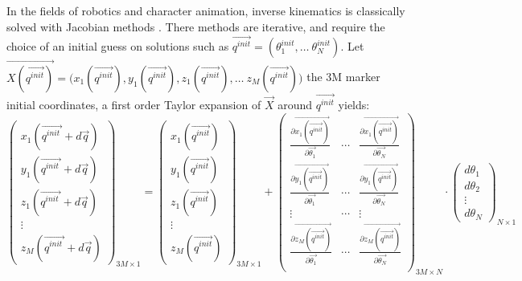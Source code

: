In the fields of robotics and character animation, inverse kinematics is classically solved with Jacobian methods \cite{Siciliano1990,Buss2009,Aristidou2018}. There methods are iterative, and require the choice of an initial guess on solutions such as $\overrightarrow{q^{init}}=(\theta_1^{init}, \dots \  \theta_N^{init})$. Let  $\overrightarrow{X(\overrightarrow{q^{init}})} = \bigl(x_1(\overrightarrow{q^{init}}), y_1(\overrightarrow{q^{init}}), z_1(\overrightarrow{q^{init}}), \dots \ z_M(\overrightarrow{q^{init}})\bigr)$ the 3M marker initial coordinates, a first order Taylor expansion of $\overrightarrow{X}$ around $\overrightarrow{q^{init}}$ yields:
\begin{equation}
    \begin{pmatrix}x_1(\overrightarrow{q^{init ^{\ }}}+d\overrightarrow{q})\\ y_1(\overrightarrow{q^{init ^{\ }}}+d\overrightarrow{q})\\ z_1(\overrightarrow{q^{init ^{\ }}}+d\overrightarrow{q})\\ \vdots \\ z_M(\overrightarrow{q^{init ^{\ }}}+d\overrightarrow{q})\end{pmatrix}_{3M \times 1}
    = \begin{pmatrix}x_1(\overrightarrow{q^{init}})\\ y_1(\overrightarrow{q^{init}})\\ z_1(\overrightarrow{q^{init}})\\ \vdots \\ z_M(\overrightarrow{q^{init}})\end{pmatrix}_{3M \times 1}
    + \begin{pmatrix}
        \frac{\partial{\overrightarrow{x_1(\overrightarrow{q^{init}})}}}{\partial{\overrightarrow{\theta_1}}} 
        & \cdots 
        & \frac{\partial{\overrightarrow{x_1(\overrightarrow{q^{init}})}}}{\partial{\overrightarrow{\theta_N}}} \\
        \frac{\partial{\overrightarrow{y_1(\overrightarrow{q^{init}})}}}{\partial{\overrightarrow{\theta_1}}} 
        & \cdots 
        & \frac{\partial{\overrightarrow{y_1(\overrightarrow{q^{init}})}}}{\partial{\overrightarrow{\theta_N}}} \\
        \vdots & \cdots & \vdots \\
        \frac{\partial{\overrightarrow{z_M(\overrightarrow{q^{init}})}}}{\partial{\overrightarrow{\theta_1}}} 
        & \cdots 
        & \frac{\partial{\overrightarrow{z_M(\overrightarrow{q^{init}})}}}{\partial{\overrightarrow{\theta_N}}} \\
    \end{pmatrix}_{3M\times N}
    \! \! \! \! \! \! \cdot \begin{pmatrix}d\theta_1\\ d\theta_2\\ \vdots \\ d\theta_N\end{pmatrix}_{N \times 1}
\end{equation}
